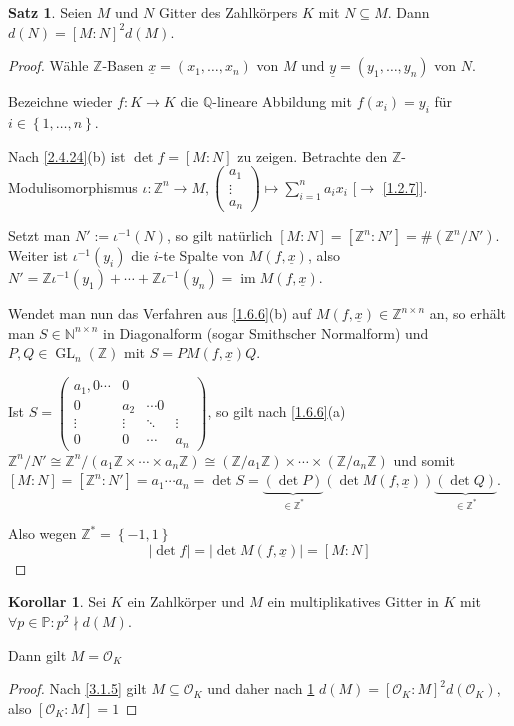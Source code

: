 \documentclass[
twoside=semi,
fontsize=12,
DIV=12, 
cleardoublepage=current,
leqno,
headings=optiontoheadandtoc, 
toc=idx
]{scrbook}
\newcommand{\N}{\mathbb{N}}
\newcommand{\Z}{\mathbb{Z}}
\newcommand{\Q}{\mathbb{Q}}
\renewcommand{\P}{\mathbb{P}}
\newcommand{\set}[1]{\left\{ #1 \right\}}
\DeclareMathOperator{\im}{im}
\DeclareMathOperator{\GL}{GL}
\theoremstyle{definition}
\newtheorem{satz}[definition]{Satz}
\newtheorem{korollar}[definition]{Korollar}
\begin{document}
	\begin{satz}\label{3.1.7}
		Seien $M$ und $N$ Gitter des Zahlk\"orpers $K$ mit $N \subseteq M$. Dann $d(N) = [M:N]^2 d(M)$.
		
		\begin{proof}
			W\"ahle $\Z$-Basen $\underline{x} = (x_1, \dots, x_n)$ von $M$ und $\underline{y} = (y_1, \dots, y_n)$ von $N$.
			
			Bezeichne wieder $f:K\to K$ die $\Q$-lineare Abbildung mit $f(x_i) = y_i$ f\"ur $i \in \set{1, \dots, n}$.
			
			Nach \ref{2.4.24}(b) ist $\det f = [M:N]$ zu zeigen. Betrachte den $\Z$-Modulisomorphismus $\iota : \Z^n \to M, \begin{pmatrix}
				a_1\\ \vdots \\ a_n
			\end{pmatrix} \mapsto \sum_{i=1}^{n} a_ix_i$ [$\to$ \ref{1.2.7}].
		
			Setzt man $N' := \iota^{-1} (N)$, so gilt nat\"urlich $[M:N] = [\Z^n:N'] = \#(\Z^n/N')$. Weiter ist $\iota^{-1}(y_i)$
			die $i$-te Spalte von $M(f, \underline{x})$, also $N' = \Z\iota^{-1}(y_1) + \cdots + \Z\iota^{-1}(y_n) = \im M(f, \underline{x})$.
			
			Wendet man nun das Verfahren aus \ref{1.6.6}(b) auf $M(f, \underline{x}) \in \Z^{n \times n}$ an, so erh\"alt man $S \in \N^{n\times n}$ in Diagonalform (sogar 
			Smithscher Normalform) und $P, Q \in \GL_n(\Z)$ mit $S = PM(f, \underline{x})Q$.
			
			Ist $S = \begin{pmatrix}
				a_1, 0 \cdots & 0\\
				0 & a_2 & \cdots 0\\
				\vdots & \vdots & \ddots & \vdots\\
				0 & 0 & \cdots & a_n
			\end{pmatrix}$, so gilt nach \ref{1.6.6}(a) $\Z^n/N' \cong \Z^n / (a_1\Z \times \cdots \times a_n \Z) \cong (\Z/a_1\Z) \times \cdots \times (\Z/a_n\Z)$ 
			und somit $[M:N] = [\Z^n:N'] = a_1 \cdots a_n = \det S = \underbrace{(\det P)}_{\in \Z^*} (\det M(f, \underline{x})) \underbrace{(\det Q)}_{\in \Z^*}$.
			
			Also wegen $\Z^* = \set{-1, 1}$ 
				\[|\det f| = |\det M(f, \underline{x})| = [M:N]\]
 		\end{proof}
	\end{satz}

	\begin{korollar}\label{3.1.8}
		Sei $K$ ein Zahlk\"orper und $M$ ein multiplikatives Gitter in $K$ mit $\forall p \in \P: p^2 \nmid d(M)$.
		
		Dann gilt $M = \mathcal{O}_K$
		
		\begin{proof}
			Nach \ref{3.1.5} gilt $M \subseteq \mathcal{O}_K$ und daher nach \ref{3.1.7} $d(M) = [\mathcal{O}_K:M]^2d(\mathcal{O}_K)$, 
			also $[\mathcal{O}_K:M] = 1$
		\end{proof}
	\end{korollar}
\end{document}
